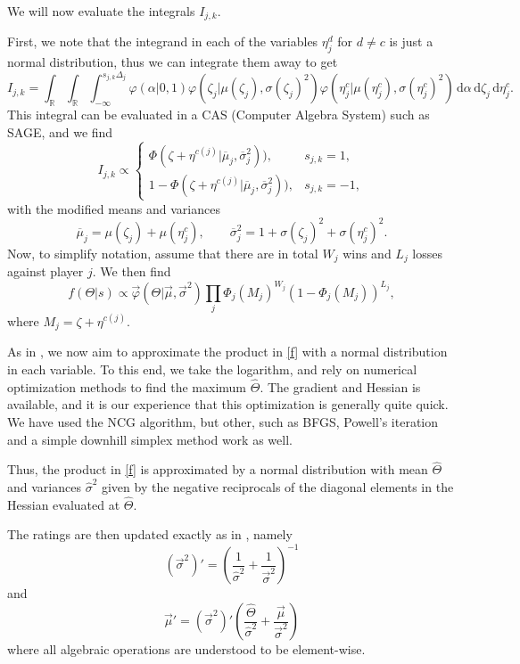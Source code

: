 \documentclass[a4paper, twoside, notitlepage, 11pt]{article}
\newcommand{\R}{\mathbb{R}}
\newcommand{\dd}{\,\mathrm{d}}
\begin{document}
We will now evaluate the integrals $I_{j,k}$.

First, we note that the integrand in each of the variables $\eta_j^d$ for
$d\neq c$ is just a normal distribution, thus we can integrate them away to get
$$
    I_{j,k} = \int_\R\int_\R\int_{-\infty}^{s_{j,k}\Delta_j}
    \varphi(\alpha|0,1)\varphi(\zeta_j|\mu(\zeta_j),\sigma(\zeta_j)^2)
    \varphi(\eta^c_j|\mu(\eta^c_j),\sigma(\eta^c_j)^2) 
    \dd\alpha\dd\zeta_j\dd\eta^c_j.
$$
This integral can be evaluated in a CAS (Computer Algebra System) such as SAGE,
and we find
$$
    I_{j,k} \propto \begin{cases}
    \Phi(\zeta+\eta^{c(j)}|\overline{\mu}_j,\overline{\sigma}_j^2)),&s_{j,k}=1,\\
    1-\Phi(\zeta+\eta^{c(j)}|\overline{\mu}_j,\overline{\sigma}_j^2)),&s_{j,k}=-1,
    \end{cases}
$$
with the modified means and variances
$$
    \overline{\mu}_j = \mu(\zeta_j) + \mu(\eta^c_j),\qquad
    \overline{\sigma}_j^2 = 1 + \sigma(\zeta_j)^2 + \sigma(\eta^c_j)^2.
$$
Now, to simplify notation, assume that there are in total $W_j$ wins and $L_j$
losses against player $j$. We then find
\begin{equation} \label{f}
    f(\Theta|s) \propto \vec{\varphi}(\Theta|\vec{\mu},\vec{\sigma}^2)\prod_j
    \Phi_j(M_j)^{W_j}\left(1-\Phi_j(M_j)\right)^{L_j},
\end{equation}
where $M_j=\zeta+\eta^{c(j)}$.

As in \cite{Glickman99}, we now aim to approximate the product in \eqref{f}
with a normal distribution in each variable. To this end, we take the
logarithm, and rely on numerical optimization methods to find the maximum
$\hat{\Theta}$. The gradient and Hessian is available, and it is our experience
that this optimization is generally quite quick. We have used the NCG
algorithm, but other, such as BFGS, Powell's iteration and a simple downhill
simplex method work as well.

Thus, the product in \eqref{f} is approximated by a normal distribution with
mean $\hat{\Theta}$ and variances $\hat{\sigma}^2$ given by the negative
reciprocals of the diagonal elements in the Hessian evaluated at
$\hat{\Theta}$.

The ratings are then updated exactly as in \cite{Glickman99}, namely
$$
    (\vec{\sigma}^2)' = \left(\frac{1}{\hat{\sigma}^2} +
    \frac{1}{\vec{\sigma}^2}\right)^{-1}
$$
and
$$
\vec{\mu}' = (\vec{\sigma}^2)'\left(\frac{\hat{\Theta}}{\hat{\sigma}^2} +
    \frac{\vec{\mu}}{\vec{\sigma}^2}\right)
$$
where all algebraic operations are understood to be element-wise.
\end{document}
